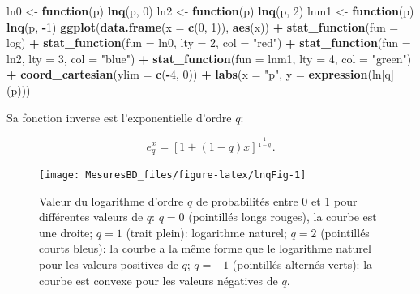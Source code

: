 \documentclass[
  11pt,
  french,
  a4paper,
  extrafontsizes,onecolumn,openright
  ]{memoir}
\newenvironment{Shaded}{\begin{snugshade}}{\end{snugshade}}
\newcommand{\AttributeTok}[1]{\textcolor[rgb]{0.13,0.29,0.53}{#1}}
\newcommand{\ControlFlowTok}[1]{\textcolor[rgb]{0.13,0.29,0.53}{\textbf{#1}}}
\newcommand{\DecValTok}[1]{\textcolor[rgb]{0.00,0.00,0.81}{#1}}
\newcommand{\FunctionTok}[1]{\textcolor[rgb]{0.13,0.29,0.53}{\textbf{#1}}}
\newcommand{\NormalTok}[1]{#1}
\newcommand{\OtherTok}[1]{\textcolor[rgb]{0.56,0.35,0.01}{#1}}
\newcommand{\SpecialCharTok}[1]{\textcolor[rgb]{0.81,0.36,0.00}{\textbf{#1}}}
\newcommand{\StringTok}[1]{\textcolor[rgb]{0.31,0.60,0.02}{#1}}
\begin{document}
\begin{Shaded}
\begin{Highlighting}[]
\NormalTok{ln0 }\OtherTok{\textless{}{-}} \ControlFlowTok{function}\NormalTok{(p) }\FunctionTok{lnq}\NormalTok{(p, }\DecValTok{0}\NormalTok{)}
\NormalTok{ln2 }\OtherTok{\textless{}{-}} \ControlFlowTok{function}\NormalTok{(p) }\FunctionTok{lnq}\NormalTok{(p, }\DecValTok{2}\NormalTok{)}
\NormalTok{lnm1 }\OtherTok{\textless{}{-}} \ControlFlowTok{function}\NormalTok{(p) }\FunctionTok{lnq}\NormalTok{(p, }\SpecialCharTok{{-}}\DecValTok{1}\NormalTok{)}
\FunctionTok{ggplot}\NormalTok{(}\FunctionTok{data.frame}\NormalTok{(}\AttributeTok{x =} \FunctionTok{c}\NormalTok{(}\DecValTok{0}\NormalTok{, }\DecValTok{1}\NormalTok{)), }\FunctionTok{aes}\NormalTok{(x)) }\SpecialCharTok{+} 
    \FunctionTok{stat\_function}\NormalTok{(}\AttributeTok{fun =}\NormalTok{ log) }\SpecialCharTok{+}
    \FunctionTok{stat\_function}\NormalTok{(}\AttributeTok{fun =}\NormalTok{ ln0, }\AttributeTok{lty =} \DecValTok{2}\NormalTok{, }\AttributeTok{col =} \StringTok{"red"}\NormalTok{) }\SpecialCharTok{+}
    \FunctionTok{stat\_function}\NormalTok{(}\AttributeTok{fun =}\NormalTok{ ln2, }\AttributeTok{lty =} \DecValTok{3}\NormalTok{, }\AttributeTok{col =} \StringTok{"blue"}\NormalTok{) }\SpecialCharTok{+}
    \FunctionTok{stat\_function}\NormalTok{(}\AttributeTok{fun =}\NormalTok{ lnm1, }\AttributeTok{lty =} \DecValTok{4}\NormalTok{, }\AttributeTok{col =} \StringTok{"green"}\NormalTok{) }\SpecialCharTok{+}
    \FunctionTok{coord\_cartesian}\NormalTok{(}\AttributeTok{ylim =} \FunctionTok{c}\NormalTok{(}\SpecialCharTok{{-}}\DecValTok{4}\NormalTok{, }\DecValTok{0}\NormalTok{)) }\SpecialCharTok{+}
    \FunctionTok{labs}\NormalTok{(}\AttributeTok{x =} \StringTok{"p"}\NormalTok{, }\AttributeTok{y =} \FunctionTok{expression}\NormalTok{(ln[q](p)))}
\end{Highlighting}
\end{Shaded}

\normalsize

Sa fonction inverse est l'exponentielle d'ordre \(q\):

\begin{equation}
  \label{eq:expq}
  e^x_q = \left[ 1+\left( 1-q \right)x \right]^{\frac{1}{1-q}}.
\end{equation}



\scriptsize

\begin{figure}

{\centering \texttt{[image: MesuresBD\_files/figure-latex/lnqFig-1]} 

}

\caption{Valeur du logarithme d'ordre \(q\) de probabilités entre 0 et 1 pour différentes valeurs de \(q\): \(q = 0\) (pointillés longs rouges), la courbe est une droite; \(q = 1\) (trait plein): logarithme naturel; \(q = 2\) (pointillés courts bleus): la courbe a la même forme que le logarithme naturel pour les valeurs positives de \(q\); \(q =-1\) (pointillés alternés verts): la courbe est convexe pour les valeurs négatives de \(q\).}\label{fig:lnqFig}
\end{figure}
\end{document}
